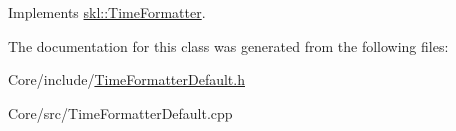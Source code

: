Implements \hyperlink{classskl_1_1_time_formatter}{skl\+::\+Time\+Formatter}.



The documentation for this class was generated from the following files\+:\begin{DoxyCompactItemize}
\item 
Core/include/\hyperlink{_time_formatter_default_8h}{Time\+Formatter\+Default.\+h}\item 
Core/src/Time\+Formatter\+Default.\+cpp\end{DoxyCompactItemize}
